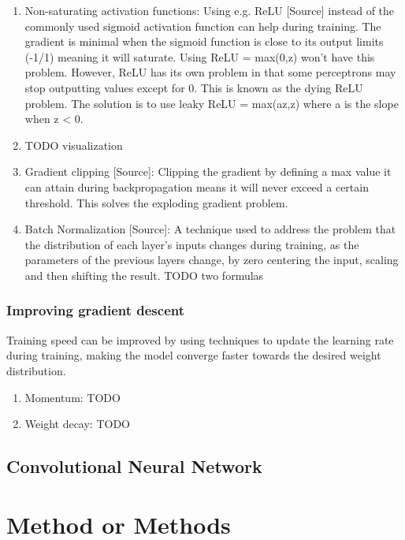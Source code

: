 \documentclass[english, bibtex]{kththesis}
\begin{document}
\begin{enumerate}
\item Non-saturating activation functions: Using e.g. ReLU [Source] instead of the commonly used sigmoid activation function can help during training. The gradient is minimal when the sigmoid function is close to its output limits (-1/1) meaning it will saturate. Using ReLU = max(0,z) won't have this problem. However, ReLU has its own problem in that some perceptrons may stop outputting values except for 0. This is known as the dying ReLU problem. The solution is to use leaky ReLU = max(az,z) where a is the slope when z < 0. 

\item TODO visualization

\item Gradient clipping [Source]: Clipping the gradient by defining a max value it can attain during backpropagation means it will never exceed a certain threshold. This solves the exploding gradient problem.

\item Batch Normalization [Source]: A technique used to address the problem that the distribution of each layer’s inputs changes during training, as the parameters of the previous layers change, by zero centering the input, scaling and then shifting the result. TODO two formulas

\end{enumerate}
\subsection{Improving gradient descent}

Training speed can be improved by using techniques to update the learning rate during training, making the model converge faster towards the desired weight distribution.
\begin{enumerate}
\item Momentum: TODO
\item Weight decay: TODO
\end{enumerate}


\section{Convolutional Neural Network}

\cleardoublepage
\chapter{Method or Methods}
\label{ch:methods}
\end{document}

